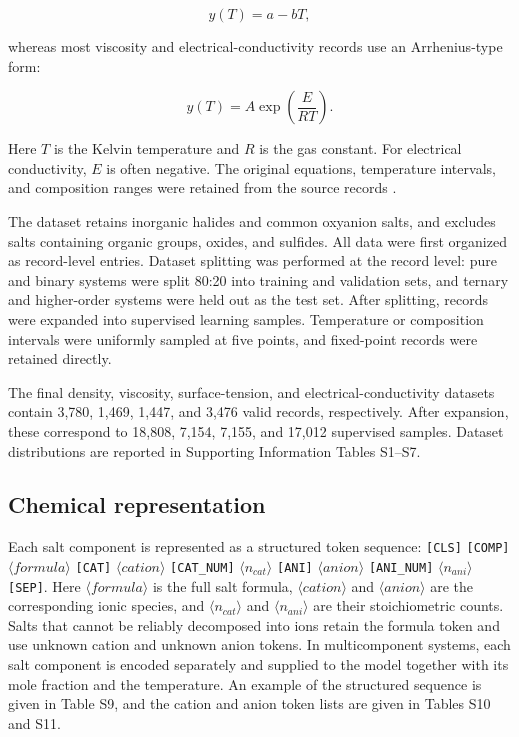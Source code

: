 \documentclass[journal=jctcce,manuscript=article,doi=true]{achemso}
\begin{document}
\[
y(T)=a-bT,
\tag{1}
\]

whereas most viscosity and electrical-conductivity records use an Arrhenius-type form:

\[
y(T)=A\exp\left(\frac{E}{RT}\right).
\tag{2}
\]

\noindent Here \(T\) is the Kelvin temperature and \(R\) is the gas constant. For electrical conductivity, \(E\) is often negative. The original equations, temperature intervals, and composition ranges were retained from the source records \cite{janz1988molten,chesser2025mstdb}.

The dataset retains inorganic halides and common oxyanion salts, and excludes salts containing organic groups, oxides, and sulfides. All data were first organized as record-level entries. Dataset splitting was performed at the record level: pure and binary systems were split 80:20 into training and validation sets, and ternary and higher-order systems were held out as the test set. After splitting, records were expanded into supervised learning samples. Temperature or composition intervals were uniformly sampled at five points, and fixed-point records were retained directly.

The final density, viscosity, surface-tension, and electrical-conductivity datasets contain 3,780, 1,469, 1,447, and 3,476 valid records, respectively. After expansion, these correspond to 18,808, 7,154, 7,155, and 17,012 supervised samples. Dataset distributions are reported in Supporting Information Tables S1--S7.

\subsection{Chemical representation}\label{sec:chemical-representation}

Each salt component is represented as a structured token sequence:
\texttt{[CLS]} \texttt{[COMP]} \(\langle formula\rangle\) \texttt{[CAT]} \(\langle cation\rangle\) \texttt{[CAT\_NUM]} \(\langle n_{cat}\rangle\) \texttt{[ANI]} \(\langle anion\rangle\) \texttt{[ANI\_NUM]} \(\langle n_{ani}\rangle\) \texttt{[SEP]}. Here \(\langle formula\rangle\) is the full salt formula, \(\langle cation\rangle\) and \(\langle anion\rangle\) are the corresponding ionic species, and \(\langle n_{cat}\rangle\) and \(\langle n_{ani}\rangle\) are their stoichiometric counts. Salts that cannot be reliably decomposed into ions retain the formula token and use unknown cation and unknown anion tokens. In multicomponent systems, each salt component is encoded separately and supplied to the model together with its mole fraction and the temperature. An example of the structured sequence is given in Table S9, and the cation and anion token lists are given in Tables S10 and S11.
\end{document}
